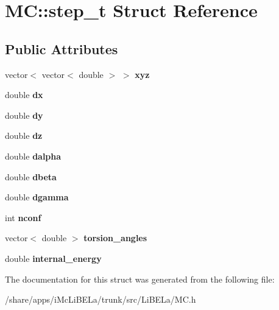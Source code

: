 \hypertarget{structMC_1_1step__t}{
\section{MC::step\_\-t Struct Reference}
\label{structMC_1_1step__t}
}
\subsection*{Public Attributes}
\begin{DoxyCompactItemize}
\item 
\hypertarget{structMC_1_1step__t_a94608452c88341f0ee63c2ecc40e6fcc}{
vector$<$ vector$<$ double $>$ $>$ {\bfseries xyz}}
\label{structMC_1_1step__t_a94608452c88341f0ee63c2ecc40e6fcc}

\item 
\hypertarget{structMC_1_1step__t_a8bf090a10a25beec181c86046004c4d2}{
double {\bfseries dx}}
\label{structMC_1_1step__t_a8bf090a10a25beec181c86046004c4d2}

\item 
\hypertarget{structMC_1_1step__t_a86595df6c1d6ece035e066c02a7dc9e7}{
double {\bfseries dy}}
\label{structMC_1_1step__t_a86595df6c1d6ece035e066c02a7dc9e7}

\item 
\hypertarget{structMC_1_1step__t_aba1f5e1e92f982d42a68b52535124205}{
double {\bfseries dz}}
\label{structMC_1_1step__t_aba1f5e1e92f982d42a68b52535124205}

\item 
\hypertarget{structMC_1_1step__t_a7a1c7936d8ef99a86939d446cefd7d57}{
double {\bfseries dalpha}}
\label{structMC_1_1step__t_a7a1c7936d8ef99a86939d446cefd7d57}

\item 
\hypertarget{structMC_1_1step__t_af09af8f41d23e9a5c22b3a010402708d}{
double {\bfseries dbeta}}
\label{structMC_1_1step__t_af09af8f41d23e9a5c22b3a010402708d}

\item 
\hypertarget{structMC_1_1step__t_a0e25f4cea26263b6ec6a1afb457e4346}{
double {\bfseries dgamma}}
\label{structMC_1_1step__t_a0e25f4cea26263b6ec6a1afb457e4346}

\item 
\hypertarget{structMC_1_1step__t_ae3aa367622bdb3e3bb09f6cef6163a93}{
int {\bfseries nconf}}
\label{structMC_1_1step__t_ae3aa367622bdb3e3bb09f6cef6163a93}

\item 
\hypertarget{structMC_1_1step__t_a6ba6c7dc642063f0b9a55ee24676b3e2}{
vector$<$ double $>$ {\bfseries torsion\_\-angles}}
\label{structMC_1_1step__t_a6ba6c7dc642063f0b9a55ee24676b3e2}

\item 
\hypertarget{structMC_1_1step__t_a6a69d8b6b1efa3788e7222163a30470c}{
double {\bfseries internal\_\-energy}}
\label{structMC_1_1step__t_a6a69d8b6b1efa3788e7222163a30470c}

\end{DoxyCompactItemize}


The documentation for this struct was generated from the following file:\begin{DoxyCompactItemize}
\item 
/share/apps/iMcLiBELa/trunk/src/LiBELa/MC.h\end{DoxyCompactItemize}

